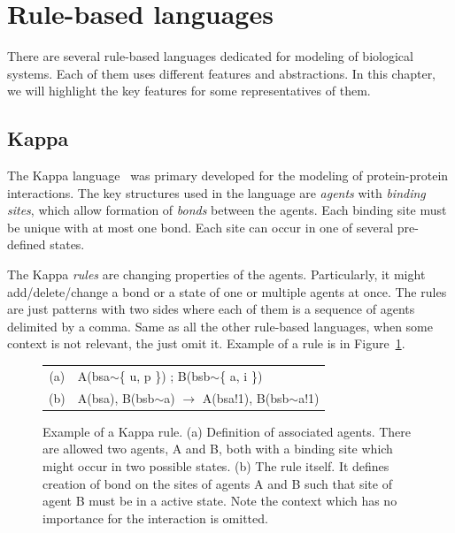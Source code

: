 \documentclass[12pt]{fithesis2}
\begin{document}
\section{Rule-based languages}
\label{rule_based_languages}

There are several rule-based languages dedicated for modeling of biological systems. Each of them uses different features and abstractions. In this chapter, we will highlight the key features for some representatives of them.

\subsection{Kappa}
\label{kappa}

The Kappa language~\cite{kappa_formal} was primary developed for the modeling of protein-protein interactions. The key structures used in the language are \textit{agents} with \textit{binding sites}, which allow formation of \emph{bonds} between the agents. Each binding site must be unique with at most one bond. Each site can occur in one of several pre-defined states.

The Kappa \textit{rules} are changing properties of the agents. Particularly, it might add/delete/change a bond or a state of one or multiple agents at once. The rules are just patterns with two sides where each of them is a sequence of agents delimited by a comma. Same as all the other rule-based languages, when some context is not relevant, the just omit it. Example of a rule is in Figure~\ref{kappa-rule}.

\begin{figure}[!h]
\begin{center}
\begin{tabular}{c l}
(a) & A(bsa$\sim$\{ u, p \}) ; B(bsb$\sim$\{ a, i \}) \\
(b) & A(bsa), B(bsb$\sim$a) $\rightarrow$ A(bsa!1), B(bsb$\sim$a!1) \\
\end{tabular}
\end{center}
\caption{Example of a Kappa rule. (a) Definition of associated agents. There are allowed two agents, A and B, both with a binding site which might occur in two possible states. (b) The rule itself. It defines creation of bond on the sites of agents A and B such that site of agent B must be in a active state. Note the context which has no importance for the interaction is omitted.}\label{kappa-rule}
\end{figure}
\end{document}

